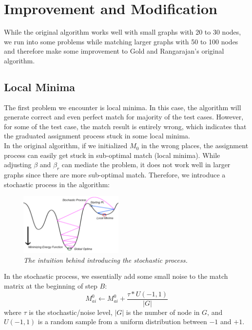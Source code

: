 \section{Improvement and Modification}

While the original algorithm works well with small graphs with 20 to 30 nodes, we run into some problems while matching larger graphs with 50 to 100 nodes and therefore make some improvement to Gold and Rangarajan's original algorithm.

\subsection{Local Minima}

The first problem we encounter is local minima. In this case, the algorithm will generate correct and even perfect match for majority of the test cases. However, for some of the test case, the match result is entirely wrong, which indicates that the graduated assignment process stuck in some local minima.\\

In the original algorithm, if we initialized $M_0$ in the wrong places, the assignment process can easily get stuck in sub-optimal match (local minima). While adjusting $\beta$ and $\beta_r$ can mediate the problem, it does not work well in larger graphs since there are more sub-optimal match. Therefore, we introduce a stochastic process in the algorithm:

\begin{figure}[h]
	\centering
	\captionsetup{justification=centering}
	\includegraphics[width=0.46\textwidth]{figs/stochastic.png}
	\caption[Caption for LOF]{\emph{The intuition behind introducing the stochastic process.}}
	\label{fig:stochastic}
\end{figure}

In the stochastic process, we essentially add some small noise to the match matrix at the beginning of step \textbf{$B$}:
\begin{equation} 
M_{ai}^{0} \leftarrow M_{ai}^{0} + \frac{\tau * U(-1,1)}{|G|}
\end{equation}
where $\tau$ is the stochastic/noise level, $|G|$ is the number of node in $G$, and $U(-1,1)$ is a random sample from a uniform distribution between $-1$ and $+1$.\\

